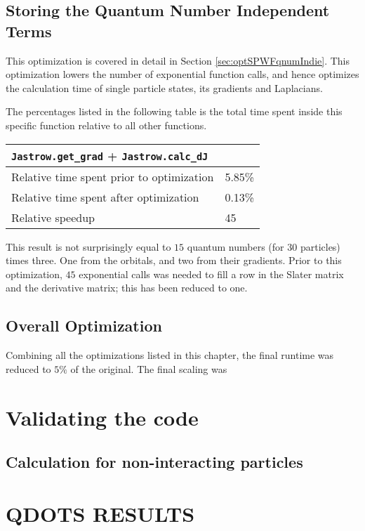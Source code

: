 \subsection{Storing the Quantum Number Independent Terms}

This optimization is covered in detail in Section \ref{sec:optSPWFqnumIndie}. This optimization lowers the number of exponential function calls, and hence optimizes the calculation time of single particle states, its gradients and Laplacians.

The percentages listed in the following table is the total time spent inside this specific function relative to all other functions. 

\begin{tabular}{ll}
 \verb+Jastrow.get_grad+ + \verb+Jastrow.calc_dJ+ & \\
 \hline\hline
 Relative time spent prior to optimization & 5.85\% \\
 Relative time spent after optimization    & 0.13\% \\
 \hline
 Relative speedup                          & 45
\end{tabular}

This result is not surprisingly equal to $15$ quantum numbers (for $30$ particles) times three. One from the orbitals, and two from their gradients. Prior to this optimization, $45$ exponential calls was needed to fill a row in the Slater matrix and the derivative matrix; this has been reduced to one.

\subsection{Overall Optimization}

Combining all the optimizations listed in this chapter, the final runtime was reduced to $5\%$ of the original. The final scaling was


\section{Validating the code}


\subsection{Calculation for non-interacting particles}

\section{QDOTS RESULTS}


